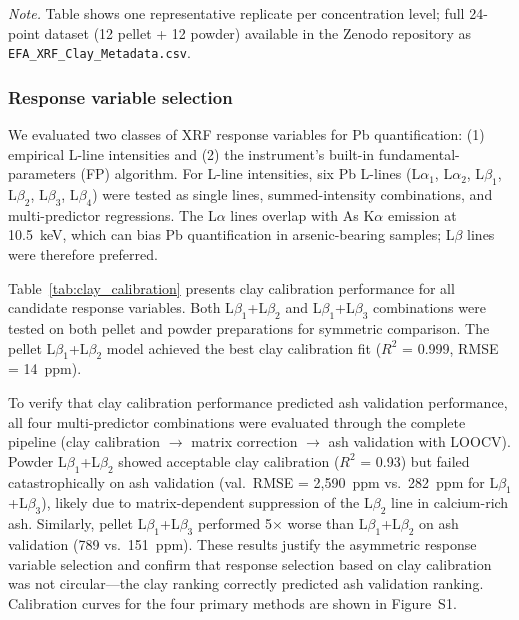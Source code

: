\documentclass[journal=esthag,manuscript=suppinfo]{achemso}
\begin{document}
\textit{Note.} Table shows one representative replicate per concentration level; full 24-point dataset (12 pellet + 12 powder) available in the Zenodo repository as \texttt{EFA\_XRF\_Clay\_Metadata.csv}.

\subsubsection*{Response variable selection}

We evaluated two classes of XRF response variables for Pb quantification: (1) empirical L-line intensities and (2) the instrument's built-in fundamental-parameters (FP) algorithm. For L-line intensities, six Pb L-lines (L$\alpha_1$, L$\alpha_2$, L$\beta_1$, L$\beta_2$, L$\beta_3$, L$\beta_4$) were tested as single lines, summed-intensity combinations, and multi-predictor regressions. The L$\alpha$ lines overlap with As K$\alpha$ emission at 10.5~keV, which can bias Pb quantification in arsenic-bearing samples; L$\beta$ lines were therefore preferred.

Table~\ref{tab:clay_calibration} presents clay calibration performance for all candidate response variables. Both L$\beta_1$+L$\beta_2$ and L$\beta_1$+L$\beta_3$ combinations were tested on both pellet and powder preparations for symmetric comparison. The pellet L$\beta_1$+L$\beta_2$ model achieved the best clay calibration fit ($R^2$ = 0.999, RMSE = 14~ppm).

To verify that clay calibration performance predicted ash validation performance, all four multi-predictor combinations were evaluated through the complete pipeline (clay calibration $\rightarrow$ matrix correction $\rightarrow$ ash validation with LOOCV). Powder L$\beta_1$+L$\beta_2$ showed acceptable clay calibration ($R^2$ = 0.93) but failed catastrophically on ash validation (val.\ RMSE = 2,590~ppm vs.\ 282~ppm for L$\beta_1$+L$\beta_3$), likely due to matrix-dependent suppression of the L$\beta_2$ line in calcium-rich ash. Similarly, pellet L$\beta_1$+L$\beta_3$ performed 5$\times$ worse than L$\beta_1$+L$\beta_2$ on ash validation (789 vs.\ 151~ppm). These results justify the asymmetric response variable selection and confirm that response selection based on clay calibration was not circular---the clay ranking correctly predicted ash validation ranking. Calibration curves for the four primary methods are shown in Figure~S1.
\end{document}
